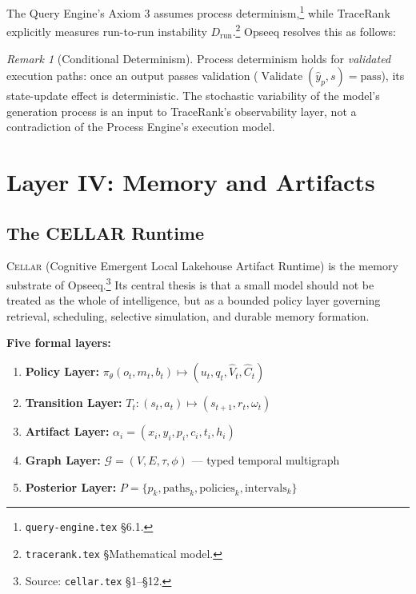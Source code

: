 \documentclass[11pt]{article}
\theoremstyle{remark}
\newtheorem{remark}{Remark}
\DeclareMathOperator{\Validate}{Validate}
\newcommand{\yp}{\hat{y}_p}
\newcommand{\graph}{\mathcal{G}}
\newcommand{\cellar}{\textsc{Cellar}}
\begin{document}
The Query Engine's Axiom 3 assumes process determinism,\footnote{\texttt{query-engine.tex} \S6.1.} while TraceRank explicitly measures run-to-run instability $D_{\mathrm{run}}$.\footnote{\texttt{tracerank.tex} \S Mathematical model.} Opseeq resolves this as follows:

\begin{remark}[Conditional Determinism]
Process determinism holds for \emph{validated} execution paths: once an output passes validation ($\Validate(\yp, s) = \mathrm{pass}$), its state-update effect is deterministic. The stochastic variability of the model's generation process is an input to TraceRank's observability layer, not a contradiction of the Process Engine's execution model.
\end{remark}

\section{Layer IV: Memory and Artifacts}
\label{sec:memory}

\subsection{The CELLAR Runtime}
\label{subsec:cellar}

\cellar{} (Cognitive Emergent Local Lakehouse Artifact Runtime) is the memory substrate of Opseeq.\footnote{Source: \texttt{cellar.tex} \S1--\S12.} Its central thesis is that a small model should not be treated as the whole of intelligence, but as a bounded policy layer governing retrieval, scheduling, selective simulation, and durable memory formation.

\textbf{Five formal layers:}

\begin{enumerate}
  \item \textbf{Policy Layer:} $\pi_\theta(o_t, m_t, b_t) \mapsto (u_t, q_t, \hat{V}_t, \hat{C}_t)$
  \item \textbf{Transition Layer:} $T_t : (s_t, a_t) \mapsto (s_{t+1}, r_t, \omega_t)$
  \item \textbf{Artifact Layer:} $\alpha_i = (x_i, y_i, p_i, c_i, t_i, h_i)$
  \item \textbf{Graph Layer:} $\graph = (V, E, \tau, \phi)$ --- typed temporal multigraph
  \item \textbf{Posterior Layer:} $P = \{p_k, \mathrm{paths}_k, \mathrm{policies}_k, \mathrm{intervals}_k\}$
\end{enumerate}
\end{document}
